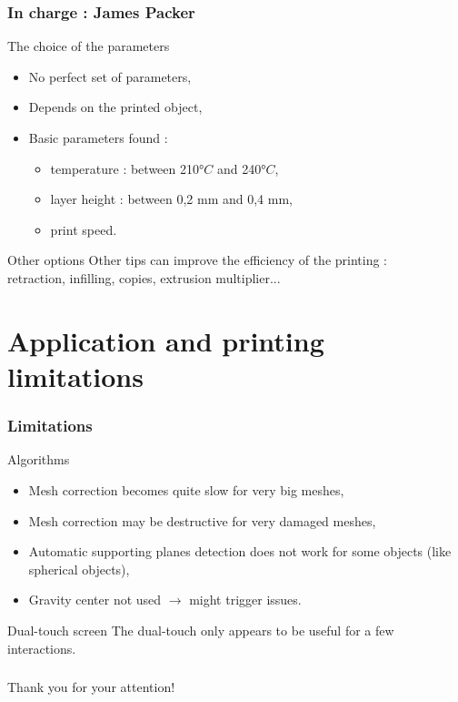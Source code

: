 \documentclass{beamer}
\begin{document}
\begin{frame}
	\frametitle{In charge : James Packer}

	\begin{block}{The choice of the parameters}
	\begin{itemize}
	\item No perfect set of parameters,
	\item Depends on the printed object,
	\item Basic parameters found :
		\begin{itemize}
		\item temperature : between 210$°C$ and 240$°C$,
		\item layer height : between 0,2 mm  and 0,4 mm,
		\item print speed.
		\end{itemize}
	\end{itemize}	
    \end{block}
    
    \begin{block}{Other options}
    Other tips can improve the efficiency of the printing :	\\
    retraction, infilling, copies, extrusion multiplier...
    \end{block}
\end{frame}

\section{Application and printing limitations}
\begin{frame}
	\frametitle{Limitations}
	
	\begin{block}{Algorithms}
    \begin{itemize}
    \item Mesh correction becomes quite slow for very big meshes,
    \item Mesh correction may be destructive for very damaged meshes,
    \item Automatic supporting planes detection does not work for some objects (like spherical objects),
    \item Gravity center not used $\rightarrow$ might trigger issues.
    \end{itemize}
    \end{block}
    
    \begin{block}{Dual-touch screen}
    The dual-touch only appears to be useful for a few interactions.
    \end{block}
\end{frame}

\begin{frame}
	\frametitle{}

    \begin{center}
    \Large{Thank you for your attention!}
    \end{center}
\end{frame}
	
\end{document}
